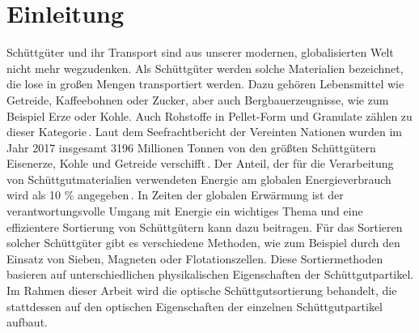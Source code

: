 \chapter{Einleitung}


Schüttgüter und ihr Transport sind aus unserer modernen, globalisierten Welt nicht mehr wegzudenken.
Als Schüttgüter werden solche Materialien bezeichnet, die lose in großen Mengen transportiert werden. 
Dazu gehören Lebensmittel wie Getreide, Kaffeebohnen oder Zucker, aber auch Bergbauerzeugnisse, wie zum Beispiel Erze oder Kohle. 
Auch Rohstoffe in Pellet-Form und Granulate zählen zu dieser Kategorie\,\cite[]{schulze2009}.
Laut dem Seefrachtbericht der Vereinten Nationen wurden im Jahr 2017 insgesamt 3196 Millionen Tonnen von den größten Schüttgütern Eisenerze, Kohle und Getreide verschifft\,\cite[Unterabschnitt 1.A.2]{unitednationsconferenceontradeanddevelopment2018}.
Der Anteil, der für die Verarbeitung von Schüttgutmaterialien verwendeten Energie am globalen Energieverbrauch wird als 10 \% angegeben\,\cite[Abschnitt 1.2]{duran2012sands}.
In Zeiten der globalen Erwärmung ist der verantwortungsvolle Umgang mit Energie ein wichtiges Thema 
und eine effizientere Sortierung von Schüttgütern kann dazu beitragen.
Für das Sortieren solcher Schüttgüter gibt es verschiedene Methoden, 
wie zum Beispiel durch den Einsatz von Sieben, Magneten oder Flotationszellen.
Diese Sortiermethoden basieren auf unterschiedlichen physikalischen Eigenschaften der Schüttgutpartikel.
Im Rahmen dieser Arbeit wird die optische Schüttgutsortierung behandelt, 
die stattdessen auf den optischen Eigenschaften der einzelnen Schüttgutpartikel aufbaut.
